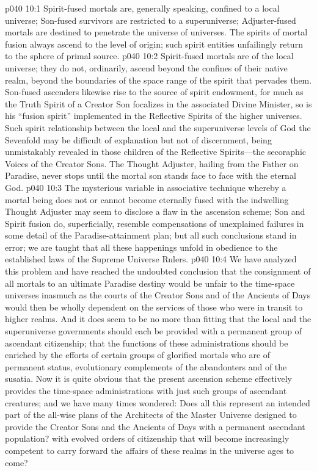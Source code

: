\vs p040 10:1 Spirit\hyp{}fused mortals are, generally speaking, confined to a local universe; Son\hyp{}fused survivors are restricted to a superuniverse; Adjuster\hyp{}fused mortals are destined to penetrate the universe of universes. The spirits of mortal fusion always ascend to the level of origin; such spirit entities unfailingly return to the sphere of primal source.
\vs p040 10:2 Spirit\hyp{}fused mortals are of the local universe; they do not, ordinarily, ascend beyond the confines of their native realm, beyond the boundaries of the space range of the spirit that pervades them. Son\hyp{}fused ascenders likewise rise to the source of spirit endowment, for much as the Truth Spirit of a Creator Son focalizes in the associated Divine Minister, so is his “fusion spirit” implemented in the Reflective Spirits of the higher universes. Such spirit relationship between the local and the superuniverse levels of God the Sevenfold may be difficult of explanation but not of discernment, being unmistakably revealed in those children of the Reflective Spirits---the secoraphic Voices of the Creator Sons. The Thought Adjuster, hailing from the Father on Paradise, never stops until the mortal son stands face to face with the eternal God.
\pc \vs p040 10:3 The mysterious variable in associative technique whereby a mortal being does not or cannot become eternally fused with the indwelling Thought Adjuster may seem to disclose a flaw in the ascension scheme; Son and Spirit fusion do, superficially, resemble compensations of unexplained failures in some detail of the Paradise\hyp{}attainment plan; but all such conclusions stand in error; we are taught that all these happenings unfold in obedience to the established laws of the Supreme Universe Rulers.
\vs p040 10:4 We have analyzed this problem and have reached the undoubted conclusion that the consignment of all mortals to an ultimate Paradise destiny would be unfair to the time\hyp{}space universes inasmuch as the courts of the Creator Sons and of the Ancients of Days would then be wholly dependent on the services of those who were in transit to higher realms. And it does seem to be no more than fitting that the local and the superuniverse governments should each be provided with a permanent group of ascendant citizenship; that the functions of these administrations should be enriched by the efforts of certain groups of glorified mortals who are of permanent status, evolutionary complements of the abandonters and of the susatia. Now it is quite obvious that the present ascension scheme effectively provides the time\hyp{}space administrations with just such groups of ascendant creatures; and we have many times wondered: Does all this represent an intended part of the all\hyp{}wise plans of the Architects of the Master Universe designed to provide the Creator Sons and the Ancients of Days with a permanent ascendant population? with evolved orders of citizenship that will become increasingly competent to carry forward the affairs of these realms in the universe ages to come?
